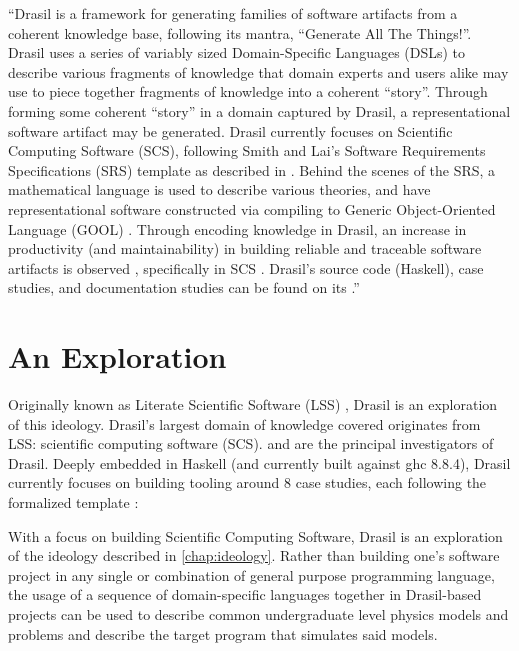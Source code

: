 
\begin{mdleftbar}
``Drasil is a framework for generating families of software artifacts from a
coherent knowledge base, following its mantra, ``Generate All The Things!''.
Drasil uses a series of variably sized Domain-Specific Languages (DSLs) to
describe various fragments of knowledge that domain experts and users alike may
use to piece together fragments of knowledge into a coherent ``story''. Through
forming some coherent ``story'' in a domain captured by Drasil, a
representational software artifact may be generated. Drasil currently focuses on
Scientific Computing Software (SCS), following Smith and Lai's Software
Requirements Specifications (SRS) template as described in
\cite{SmithAndLai2005}. Behind the scenes of the SRS, a mathematical language is
used to describe various theories, and have representational software
constructed via compiling to Generic Object-Oriented Language (GOOL)
\cite{Carette2019}. Through encoding knowledge in Drasil, an increase in
productivity (and maintainability) in building reliable and traceable software
artifacts is observed \cite{SzymczakEtAl2016}, specifically in SCS
\cite{Smith2018}. Drasil's source code (Haskell), case studies, and
documentation studies can be found on its
.''
\cite{Balaci2021Poster}
\end{mdleftbar}

\section{An Exploration}

Originally known as Literate Scientific Software (LSS) , Drasil is an
exploration of this ideology. Drasil's largest domain of knowledge covered
originates from LSS: scientific computing software (SCS).  and  are the principal investigators of
Drasil. Deeply embedded in Haskell  (and currently built against
\acs{ghc}  8.8.4), Drasil currently focuses on building tooling around
8 case studies, each following the formalized  template
\cite{SmithAndLai2005}:


With a focus on building Scientific Computing Software,
Drasil\thinspace\cite{Drasil2021} is an exploration of the ideology described in
\autoref{chap:ideology}. Rather than building one's software project in any
single or combination of general purpose programming language, the usage of a
sequence of domain-specific languages together in Drasil-based projects can be
used to describe common undergraduate level physics models and problems and
describe the target program that simulates said models.


